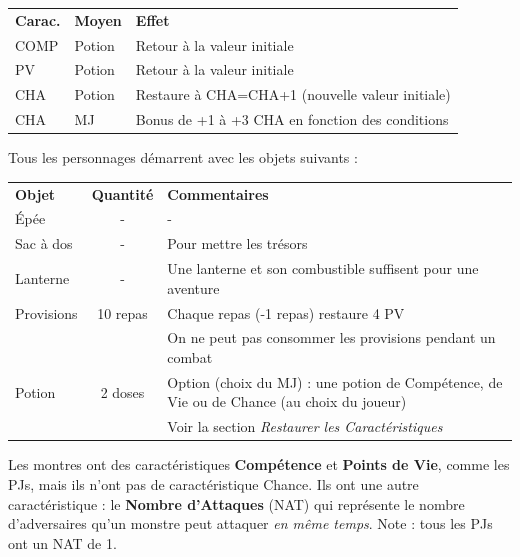 \begin{frame}[b]
{}{

\vspace{0.1cm}

\begin{tabular}{llp{6cm}}
\textbf{Carac.} & \textbf{Moyen} & \textbf{Effet} \\
COMP       & Potion  & Retour à la valeur initiale \\
PV    & Potion  & Retour à la valeur initiale \\
CHA           & Potion  & Restaure à CHA=CHA+1 (nouvelle valeur initiale) \\
CHA           & MJ      & Bonus de +1 à +3 CHA en fonction des conditions \\
\end{tabular}


\myindent Tous les personnages démarrent avec les objets suivants :

\vspace{0.2cm}

\begin{tabular}{lcp{5.4cm}}
\textbf{Objet}        & \textbf{Quantité}  & \textbf{Commentaires} \\
Épée       & - & - \\
Sac à dos   & - & Pour mettre les trésors \\
Lanterne   & - & Une lanterne et son combustible suffisent pour une aventure \\
Provisions & 10 repas & Chaque repas (-1 repas) restaure 4 PV \\
               &          & On ne peut pas consommer les provisions pendant un combat \\
Potion     & 2 doses  & Option (choix du MJ) : une potion de Compétence, de Vie ou de Chance (au choix du joueur) \\
               &          & Voir la section \textit{Restaurer les Caractéristiques} \\
\end{tabular}



\myindent Les montres ont des caractéristiques \textbf{Compétence} et \textbf{Points de Vie}, comme les PJs, mais ils n'ont pas de caractéristique Chance. Ils ont une autre caractéristique : le \textbf{Nombre d'Attaques} (NAT) qui représente le nombre d'adversaires qu'un monstre peut attaquer \textit{en même temps}. Note : tous les PJs ont un NAT de 1.

}
\end{frame}

